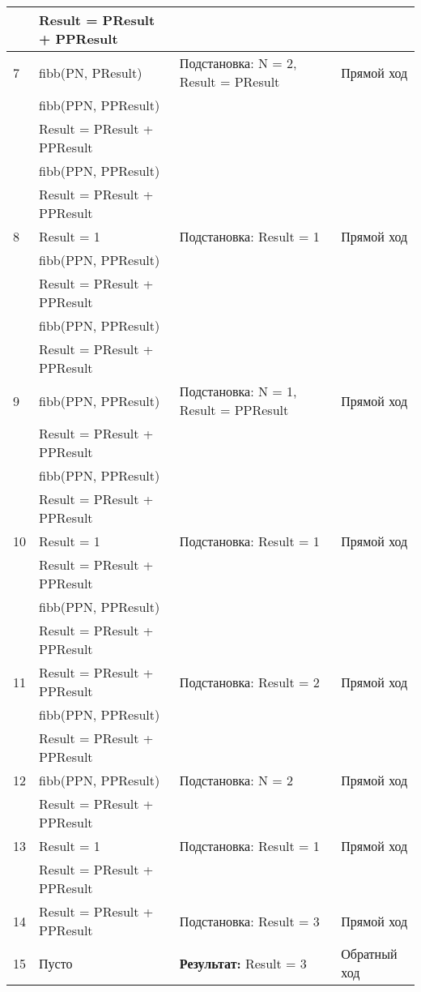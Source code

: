 {\begin{longtable}{|p{1.15cm}|p{4cm}|p{6cm}|p{6cm}|}
      & Result = PResult + PPResult & & \\
    \hline
    7 & fibb(PN, PResult) & Подстановка: N = 2, Result = PResult & Прямой ход \\
      & fibb(PPN, PPResult) & & \\
      & Result = PResult + PPResult & & \\
      & fibb(PPN, PPResult) & & \\
      & Result = PResult + PPResult & & \\
    \hline
    8 & Result = 1 & Подстановка: Result = 1 & Прямой ход \\
      & fibb(PPN, PPResult) & & \\
      & Result = PResult + PPResult & & \\
      & fibb(PPN, PPResult) & & \\
      & Result = PResult + PPResult & & \\
    \hline
    9 & fibb(PPN, PPResult) & Подстановка: N = 1, Result = PPResult & Прямой ход \\
      & Result = PResult + PPResult & & \\
      & fibb(PPN, PPResult) & & \\
      & Result = PResult + PPResult & & \\
    \hline
    10 & Result = 1 & Подстановка: Result = 1 & Прямой ход \\
       & Result = PResult + PPResult & & \\
       & fibb(PPN, PPResult) & & \\
       & Result = PResult + PPResult & & \\
    \hline
    11 & Result = PResult + PPResult & Подстановка: Result = 2 & Прямой ход \\
       & fibb(PPN, PPResult) & & \\
       & Result = PResult + PPResult & & \\
    \hline
    12 & fibb(PPN, PPResult) & Подстановка: N = 2 & Прямой ход \\
       & Result = PResult + PPResult & & \\
    \hline
    13 & Result = 1 & Подстановка: Result = 1 & Прямой ход \\
       & Result = PResult + PPResult & & \\
    \hline
    14 & Result = PResult + PPResult & Подстановка: Result = 3 & Прямой ход \\
    \hline
    15 & Пусто & \textbf{Результат:} Result = 3 & Обратный ход \\
    \hline
\end{longtable}
}
